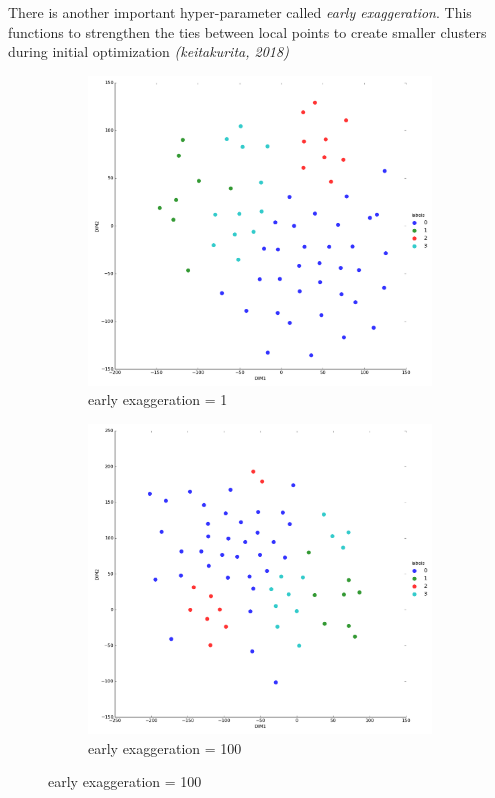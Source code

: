\documentclass[20pt]{article} %
\begin{document}
There is another important hyper-parameter called \textit{early exaggeration}.  This functions to strengthen the ties between local points to create smaller clusters during initial optimization \textit{(keitakurita, 2018)}
\begin{figure}[!htbp]
  	\centering
   	\begin{subfigure}[p]{0.45\linewidth}
    	\includegraphics[width=\linewidth]{./figures/eelow.png}
	\caption{early exaggeration = 1}
   	\end{subfigure}
  	\centering
   	\begin{subfigure}[p]{0.45\linewidth}
    	\includegraphics[width=\linewidth]{./figures/eehigh.png}
	\caption{early exaggeration = 100}
   	\end{subfigure}
\end{figure}
\end{document}

